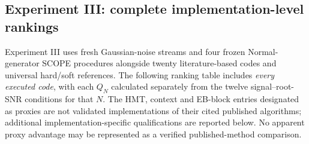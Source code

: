 \documentclass[11pt]{article}
\numberwithin{equation}{section}
\begin{document}
\subsection{Experiment III: complete implementation-level rankings}
\label{sec:supp-e3}
Experiment III uses fresh Gaussian-noise streams and four frozen
Normal-generator SCOPE procedures alongside twenty literature-based
codes and universal hard/soft references. The following ranking table
includes \emph{every executed code}, with each $Q_N$ calculated
separately from the twelve signal--root-SNR conditions for that $N$.
The HMT, context and EB-block entries designated as proxies are not
validated implementations of their cited published algorithms;
additional implementation-specific qualifications are reported below.
No apparent proxy advantage may be represented as a verified
published-method comparison.
\end{document}
